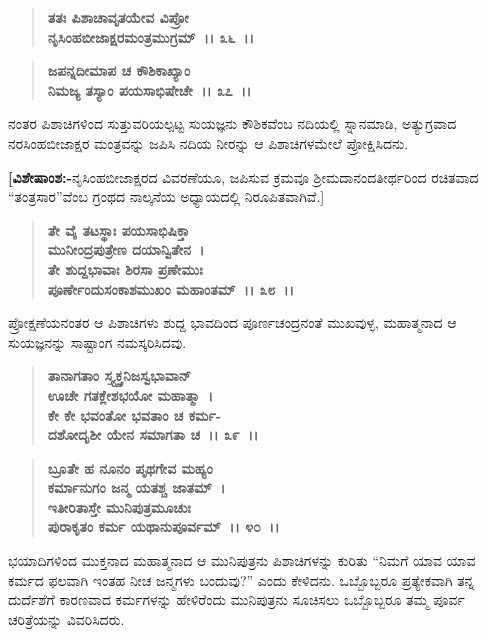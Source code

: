 \begin{verse}
\textbf{ತತಃ ಪಿಶಾಚಾವೃತಯೇವ ವಿಪ್ರೋ}\\\textbf{ನೃಸಿಂಹಬೀಜಾಕ್ಷರಮಂತ್ರಮುಗ್ರಮ್~।। ೩೬~।।} 
\end{verse}

\begin{verse}
\textbf{ಜಪನ್ನದೀಮಾಪ ಚ ಕೌಶಿಕಾಖ್ಯಾಂ}\\\textbf{ನಿಮಜ್ಯ ತಸ್ಯಾಂ ಪಯಸಾಭಿಷೇಚೇ~।। ೩೭~।।}
\end{verse}

ನಂತರ ಪಿಶಾಚಿಗಳಿಂದ ಸುತ್ತುವರಿಯಲ್ಪಟ್ಟ ಸುಯಜ್ಞನು ಕೌಶಿಕವೆಂಬ ನದಿಯಲ್ಲಿ ಸ್ನಾನಮಾಡಿ, ಅತ್ಯುಗ್ರವಾದ ನರಸಿಂಹಬೀಜಾಕ್ಷರ ಮಂತ್ರವನ್ನು ಜಪಿಸಿ ನದಿಯ ನೀರನ್ನು ಆ ಪಿಶಾಚಿಗಳಮೇಲೆ ಪ್ರೋಕ್ಷಿಸಿದನು.

\textbf{[ವಿಶೇಷಾಂಶ:-}ನೃಸಿಂಹಬೀಜಾಕ್ಷರದ ವಿವರಣೆಯೂ, ಜಪಿಸುವ ಕ್ರಮವೂ ಶ‍್ರೀಮದಾನಂದ\-ತೀರ್ಥರಿಂದ ರಚಿತವಾದ “ತಂತ್ರಸಾರ”ವೆಂಬ ಗ್ರಂಥದ ನಾಲ್ಕನೆಯ ಅಧ್ಯಾಯದಲ್ಲಿ ನಿರೂಪಿತವಾಗಿವೆ.]

\begin{verse}
\textbf{ತೇ ವೈ ತಟಸ್ಥಾಃ ಪಯಸಾಭಿಷಿಕ್ತಾ} \\\textbf{ಮುನೀಂದ್ರಪುತ್ರೇಣ ದಯಾನ್ವಿತೇನ~।}\\\textbf{ತೇ ಶುದ್ದಭಾವಾಃ ಶಿರಸಾ ಪ್ರಣೇಮುಃ} \\\textbf{ಪೂರ್ಣೇಂದುಸಂಕಾಶಮುಖಂ ಮಹಾಂತಮ್~।। ೩೮~।।}
\end{verse}

ಪ್ರೋಕ್ಷಣೆಯನಂತರ ಆ ಪಿಶಾಚಿಗಳು ಶುದ್ದ ಭಾವದಿಂದ ಪೂರ್ಣಚಂದ್ರನಂತೆ ಮುಖವುಳ್ಳ, ಮಹಾತ್ಮನಾದ ಆ ಸುಯಜ್ಞನನ್ನು ಸಾಷ್ಟಾಂಗ ನಮಸ್ಕರಿಸಿದವು.

\begin{verse}
\textbf{ತಾನಾಗತಾಂ ಸ್ತ್ಯ್ತಕ್ತನಿಜಸ್ವಭಾವಾನ್} \\\textbf{ಊಚೇ ಗತಕ್ಲೇಶಭಯೋ ಮಹಾತ್ಮಾ~।}\\\textbf{ಕೇ ಕೇ ಭವಂತೋ ಭವತಾಂ ಚ ಕರ್ಮ-} \\\textbf{ದಶೋದೃಶೀ ಯೇನ ಸಮಾಗತಾ ಚ~।। ೩೯~।। }
\end{verse}

\begin{verse}
\textbf{ಬ್ರೂತೇ ಹ ನೂನಂ ಪೃಥಗೇವ ಮಹ್ಯಂ} \\\textbf{ಕರ್ಮಾನುಗಂ ಜನ್ಮ ಯತಶ್ಚ ಜಾತಮ್~।}\\\textbf{ಇತೀರಿತಾಸ್ತೇ ಮುನಿಪುತ್ರಮೂಚುಃ} \\\textbf{ಪುರಾಕೃತಂ ಕರ್ಮ ಯಥಾನುಪೂರ್ವಮ್~।। ೪೦~।।}
\end{verse}

ಭಯಾದಿಗಳಿಂದ ಮುಕ್ತನಾದ ಮಹಾತ್ಮನಾದ ಆ ಮುನಿಪುತ್ರನು ಪಿಶಾಚಿಗಳನ್ನು ಕುರಿತು “ನಿಮಗೆ ಯಾವ ಯಾವ ಕರ್ಮದ ಫಲವಾಗಿ ಇಂತಹ ನೀಚ ಜನ್ಮಗಳು ಬಂದುವು?” ಎಂದು ಕೇಳಿದನು. ಒಬ್ಬೊಬ್ಬರೂ ಪ್ರತ್ಯೇಕವಾಗಿ ತನ್ನ ದುರ್ದೆಶೆಗೆ ಕಾರಣವಾದ ಕರ್ಮಗಳನ್ನು ಹೇಳಿರೆಂದು ಮುನಿಪುತ್ರನು ಸೂಚಿಸಲು ಒಬ್ಬೊಬ್ಬರೂ ತಮ್ಮ ಪೂರ್ವ ಚರಿತ್ರೆಯನ್ನು ವಿವರಿಸಿದರು.

